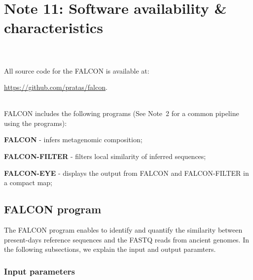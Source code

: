 \documentclass[11pt,journal,compsoc]{report}[1]
\begin{document}
\chapter*{Note 11: Software availability \& characteristics}
\label{C-SOFTWARE}

~\\
~\\
All source code for the FALCON is available at:
\begin{itemize}
\begin{sloppypar}
\item \url{https://github.com/pratas/falcon}.
\end{sloppypar}
\end{itemize}
~\\
FALCON includes the following programs (See Note~2 for a common pipeline using 
the programs):
\begin{enumerate}
\begin{sloppypar}
\item \textbf{FALCON} - infers metagenomic composition;
\item \textbf{FALCON-FILTER} - filters local similarity of inferred sequences;
\item \textbf{FALCON-EYE} - displays the output from FALCON and FALCON-FILTER in 
a compact map;
\end{sloppypar}
\end{enumerate}

\section*{FALCON program}

The FALCON program enables to identify and quantify the similarity between
present-days reference sequences and the FASTQ reads from ancient genomes.
In the following subsections, we explain the input and output paramters.

\subsection*{Input parameters}
\end{document}
